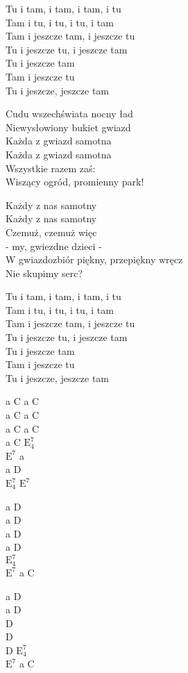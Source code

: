 \begin{text}
    Tu i tam, i tam, i tam, i tu\\
    Tam i tu, i tu, i tu, i tam\\
    Tam i jeszcze tam, i jeszcze tu\\
    Tu i jeszcze tu, i jeszcze tam\\
    Tu i jeszcze tam\\
    Tam i jeszcze tu\\
    Tu i jeszcze, jeszcze tam

    Cudu wszechświata nocny ład\\
    Niewysłowiony bukiet gwiazd\\
    Każda z gwiazd samotna\\
    Każda z gwiazd samotna\\
    Wszystkie razem zaś:\\
    Wiszący ogród, promienny park!

    Każdy z nas samotny\\
    Każdy z nas samotny\\
    Czemuż, czemuż więc\\
    - my, gwiezdne dzieci -\\
    W gwiazdozbiór piękny, przepiękny wręcz\\
    Nie skupimy serc?

    Tu i tam, i tam, i tam, i tu\\
    Tam i tu, i tu, i tu, i tam\\
    Tam i jeszcze tam, i jeszcze tu\\
    Tu i jeszcze tu, i jeszcze tam\\
    Tu i jeszcze tam\\
    Tam i jeszcze tu\\
    Tu i jeszcze, jeszcze tam
\end{text}
\begin{chord}
    a C a C\\
    a C a C\\
    a C a C\\
    a C $\mathrm{E_{4}^{7}}$\\
    $\mathrm{E^{7}}$ a\\
    a D\\
    $\mathrm{E_{4}^{7}}$ $\mathrm{E^{7}}$

    a D\\
    a D\\
    a D\\
    a D\\
    $\mathrm{E_{4}^{7}}$\\
    $\mathrm{E^{7}}$ a C

    a D\\
    a D\\
    D\\
    D\\
    D $\mathrm{E_{4}^{7}}$\\
    $\mathrm{E^{7}}$ a C
\end{chord}
